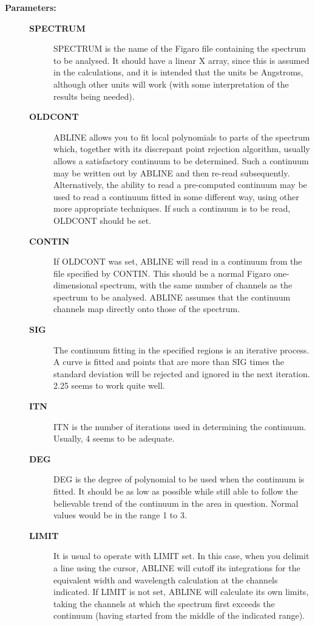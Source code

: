 \begin{description}
\item [\textbf{Parameters:}]
\begin{description}
\item [\textbf{SPECTRUM}]
 SPECTRUM is the name of the Figaro file containing the spectrum to be
 analysed.  It should have a linear X array, since this is assumed in
 the calculations, and it is intended that the units be Angstroms,
 although other units will work (with some interpretation of the
 results being needed).
\item [\textbf{OLDCONT}]
 ABLINE allows you to fit local polynomials to parts of the spectrum
 which, together with its discrepant point rejection algorithm,
 usually allows a satisfactory continuum to be determined.  Such a
 continuum may be written out by ABLINE and then re-read subsequently.
 Alternatively, the ability to read a pre-computed continuum may be
 used to read a continuum fitted in some different way, using other
 more appropriate techniques.  If such a continuum is to be read,
 OLDCONT should be set.
\item [\textbf{CONTIN}]
 If OLDCONT was set, ABLINE will read in a continuum from the
 file specified by CONTIN.  This should be a normal Figaro
 one-dimensional spectrum, with the same number of channels as the
 spectrum to be analysed.  ABLINE assumes that the continuum channels
 map directly onto those of the spectrum.
\item [\textbf{SIG}]
 The continuum fitting in the specified regions is an iterative
 process.  A curve is fitted and points that are more than SIG times
 the standard deviation will be rejected and ignored in the next
 iteration.  2.25 seems to work quite well.
\item [\textbf{ITN}]
 ITN is the number of iterations used in determining the continuum.
 Usually, 4 seems to be adequate.
\item [\textbf{DEG}]
 DEG is the degree of polynomial to be used when the continuum is
 fitted.  It should be as low as possible while still able to follow
 the believable trend of the continuum in the area in question.
 Normal values would be in the range 1 to 3.
\item [\textbf{LIMIT}]
 It is usual to operate with LIMIT set.  In this case, when you
 delimit a line using the cursor, ABLINE will cutoff its integrations
 for the equivalent width and wavelength calculation at the channels
 indicated.  If LIMIT is not set, ABLINE will calculate its own
 limits, taking the channels at which the spectrum first exceeds the
 continuum (having started from the middle of the indicated range).

\end{description}
\end{description}
